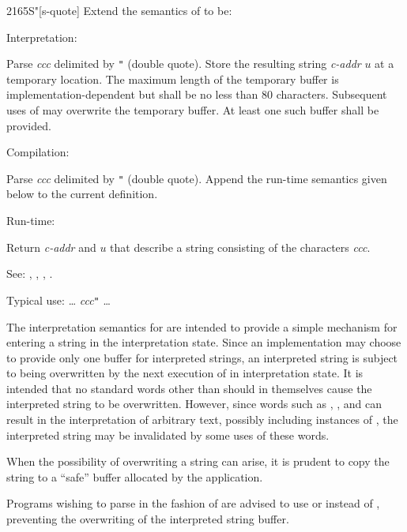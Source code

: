 \begin{newword}[Sq]{2165}{S"}[s-quote]
	Extend the semantics of  to be:

\item[Interpretation:]

	Parse \emph{ccc} delimited by \texttt{"} (double quote). Store
	the resulting string \emph{c-addr} $u$ at a temporary location.
	The maximum length of the temporary buffer is
	implementation-dependent but shall be no less than 80 characters.
	Subsequent uses of  may overwrite the temporary buffer.
	At least one such buffer shall be provided.

\item[Compilation:]

	Parse \emph{ccc} delimited by \texttt{"} (double quote). Append
	the run-time semantics given below to the current definition.

\item[Run-time:]

	Return \emph{c-addr} and $u$ that describe a string consisting
	of the characters \emph{ccc}.

\item[See:]
	,
	,
	,
	.

	\begin{rationale} %
		Typical use:
			{\ldots}  \emph{ccc}\texttt{"} {\ldots}

		The interpretation semantics for  are intended to
		provide a simple mechanism for entering a string in the
		interpretation state. Since an implementation may choose to
		provide only one buffer for interpreted strings, an
		interpreted string is subject to being overwritten by the
		next execution of  in interpretation state. It is
		intended that no standard words other than  should
		in themselves cause the interpreted string to be overwritten.
		However, since words such as ,
		,  and
		 can result in the interpretation of arbitrary
		text, possibly including instances of , the
		interpreted string may be invalidated by some uses of these
		words.

		When the possibility of overwriting a string can arise, it is
		prudent to copy the string to a ``safe'' buffer allocated by
		the application.

		Programs wishing to parse in the fashion of  are
		advised to use  or 
		 instead of , preventing the
		overwriting of the interpreted string buffer.
	\end{rationale}
\end{newword}



